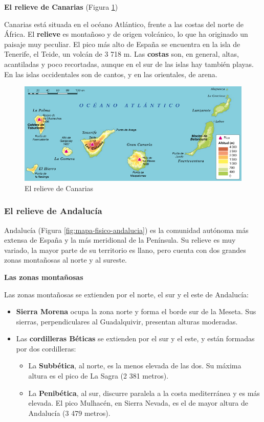 \textbf{El relieve de Canarias} (Figura \ref{fig:relieve-canarias})

\vspace{3mm}
Canarias está situada en el océano Atlántico, frente a las costas del norte de África. El \textbf{relieve} es montañoso y de origen volcánico, lo que ha originado un paisaje muy peculiar. El pico más alto de España se encuentra en la isla de Tenerife, el Teide, un volcán de 3 718 m. Las \textbf{costas} son, en general, altas, acantiladas y poco recortadas, aunque en el sur de las islas hay también playas. En las islas occidentales son de cantos, y en las orientales, de arena.

\begin{figure}[!ht]
    \centering
    \includegraphics[width=0.7\linewidth]{Tema2/04_relieve_Canarias.png}
    \caption{El relieve de Canarias}
    \label{fig:relieve-canarias}
\end{figure}

\subsubsection{El relieve de Andalucía}

Andalucía (Figura \ref{fig:mapa-fisico-andalucia}) es la comunidad autónoma más extensa de España y la más meridional de la Península. Su relieve es muy variado, la mayor parte de su territorio es llano, pero cuenta con dos grandes zonas montañosas al norte y al sureste.

\vspace{3mm}
\textbf{Las zonas montañosas}

\vspace{3mm}
Las zonas montañosas se extienden por el norte, el sur y el este de Andalucía:

\begin{itemize}
    \item \textbf{Sierra Morena} ocupa la zona norte y forma el borde sur de la Meseta. Sus sierras, perpendiculares al Guadalquivir, presentan alturas moderadas.
    \item Las \textbf{cordilleras Béticas} se extienden por el sur y el este, y están formadas por dos cordilleras:
    \begin{itemize}
        \item La \textbf{Subbética}, al norte, es la menos elevada de las dos. Su máxima altura es el pico de La Sagra (2 381 metros).
        \item La \textbf{Penibética}, al sur, discurre paralela a la costa mediterránea y es más elevada. El pico Mulhacén, en Sierra Nevada, es el de mayor altura de Andalucía (3 479 metros).
    \end{itemize}
\end{itemize}

